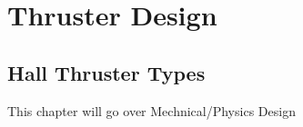 \section{Thruster Design}

\subsection{Hall Thruster Types}

This chapter will go over Mechnical/Physics Design